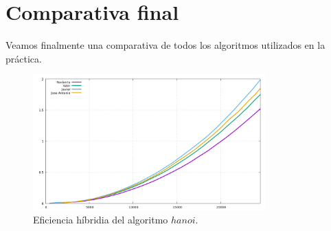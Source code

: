 \documentclass[11pt,a4paper]{article}
\begin{document}
\section{Comparativa final}

Veamos finalmente una comparativa de todos los algoritmos utilizados en la práctica.

\begin{figure}[H]
	\centering
	\includegraphics[width=0.8\textwidth]{../plots/burbuja}
	\caption{Eficiencia híbridia del algoritmo $hanoi$.}
\end{figure}
\end{document}
